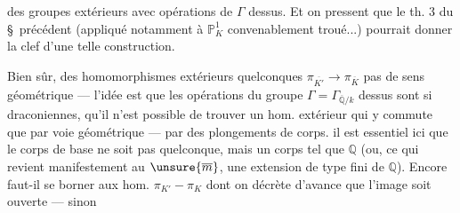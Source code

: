des groupes  extérieurs avec opérations de $\Gamma$ dessus. Et on pressent que le th. 3 du \S\ précédent (appliqué notamment à $\mathbb P_K^1$ convenablement troué...) pourrait donner la clef d'une telle construction.

Bien  sûr, des homomorphismes extérieurs quelconques $\pi_{\overline{K'}}\longrightarrow\pi_{\overline K}$  pas de sens géométrique --- l'idée est que les opérations du groupe $\Gamma=\Gamma_{\overline{\mathbb Q}/k}$ dessus sont si draconiennes, qu'il n'est possible de trouver un hom. extérieur qui y commute que par voie géométrique --- par des plongements de corps.  il est essentiel ici que le corps de base ne soit pas quelconque, mais un corps tel que $\mathbb Q$ (ou, ce qui revient manifestement au $\unsure{\overline m}$, une extension de type fini de $\mathbb Q$). Encore faut-il se borner aux hom. $\pi_{K'}-\pi_K$ dont on décrète d'avance que l'image soit ouverte --- sinon
